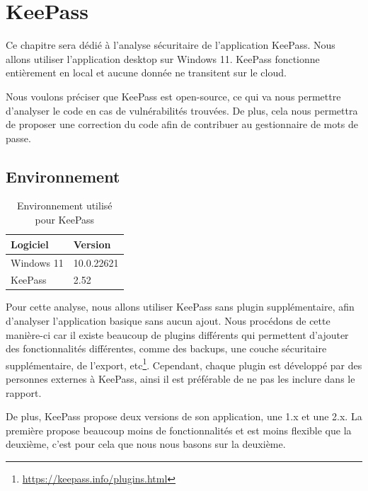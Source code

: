 
\chapter{KeePass}
\label{ch:keepass}

Ce chapitre sera dédié à l'analyse sécuritaire de l'application KeePass. Nous allons utiliser l'application desktop sur Windows 11. KeePass fonctionne entièrement en local et aucune donnée ne transitent sur le cloud. 

Nous voulons préciser que KeePass est open-source, ce qui va nous permettre d'analyser le code en cas de vulnérabilités trouvées. De  plus, cela nous permettra de proposer une correction du code afin de contribuer au gestionnaire de mots de passe.

\section{Environnement}

\begin{table}[H]
	\centering
	\begin{tabular}{ll}
		\hline
		Logiciel           & Version        \\ \hline
		Windows 11         & 10.0.22621     \\
		KeePass & 2.52       \\ \hline
	\end{tabular}
	\caption{Environnement utilisé pour KeePass}
\end{table}

Pour cette analyse, nous allons utiliser KeePass sans plugin supplémentaire, afin d'analyser l'application basique sans aucun ajout. Nous procédons de cette manière-ci car il existe beaucoup de plugins différents qui permettent d'ajouter des fonctionnalités différentes, comme des backups, une couche sécuritaire supplémentaire, de l'export, etc\footnote{\href{https://keepass.info/plugins.html}{https://keepass.info/plugins.html}}. Cependant, chaque plugin est développé par des personnes externes à KeePass, ainsi il est préférable de ne pas les inclure dans le rapport.

De plus, KeePass propose deux versions de son application, une 1.x et une 2.x. La première propose beaucoup moins de fonctionnalités et est moins flexible que la deuxième, c'est pour cela que nous nous basons sur la deuxième.
